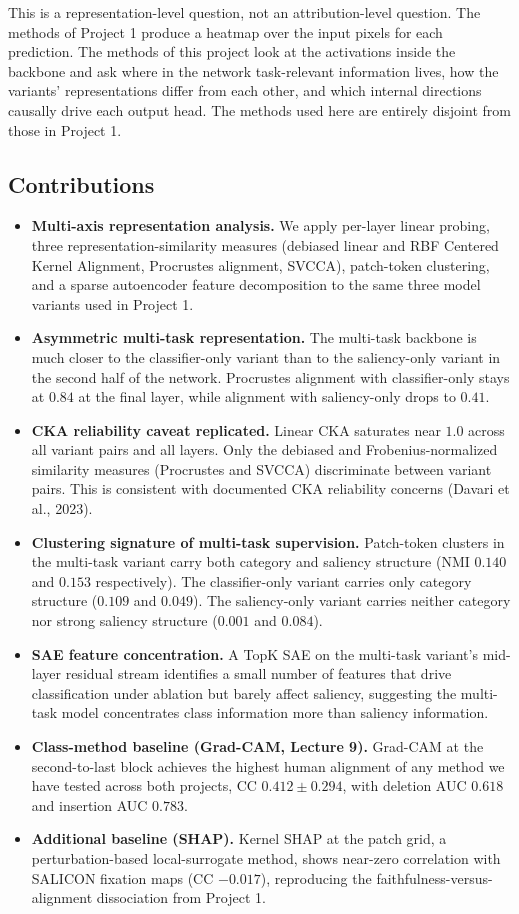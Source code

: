 \documentclass{article}
\begin{document}
This is a representation-level question, not an attribution-level question. The methods of Project 1 produce a heatmap over the input pixels for each prediction. The methods of this project look at the activations inside the backbone and ask where in the network task-relevant information lives, how the variants' representations differ from each other, and which internal directions causally drive each output head. The methods used here are entirely disjoint from those in Project 1.

\subsection{Contributions}
\begin{itemize}
    \item \textbf{Multi-axis representation analysis.} We apply per-layer linear probing, three representation-similarity measures (debiased linear and RBF Centered Kernel Alignment, Procrustes alignment, SVCCA), patch-token clustering, and a sparse autoencoder feature decomposition to the same three model variants used in Project 1.
    \item \textbf{Asymmetric multi-task representation.} The multi-task backbone is much closer to the classifier-only variant than to the saliency-only variant in the second half of the network. Procrustes alignment with classifier-only stays at $0.84$ at the final layer, while alignment with saliency-only drops to $0.41$.
    \item \textbf{CKA reliability caveat replicated.} Linear CKA saturates near $1.0$ across all variant pairs and all layers. Only the debiased and Frobenius-normalized similarity measures (Procrustes and SVCCA) discriminate between variant pairs. This is consistent with documented CKA reliability concerns (Davari et al., 2023).
    \item \textbf{Clustering signature of multi-task supervision.} Patch-token clusters in the multi-task variant carry both category and saliency structure (NMI $0.140$ and $0.153$ respectively). The classifier-only variant carries only category structure ($0.109$ and $0.049$). The saliency-only variant carries neither category nor strong saliency structure ($0.001$ and $0.084$).
    \item \textbf{SAE feature concentration.} A TopK SAE on the multi-task variant's mid-layer residual stream identifies a small number of features that drive classification under ablation but barely affect saliency, suggesting the multi-task model concentrates class information more than saliency information.
    \item \textbf{Class-method baseline (Grad-CAM, Lecture 9).} Grad-CAM at the second-to-last block achieves the highest human alignment of any method we have tested across both projects, CC $0.412 \pm 0.294$, with deletion AUC $0.618$ and insertion AUC $0.783$.
    \item \textbf{Additional baseline (SHAP).} Kernel SHAP at the patch grid, a perturbation-based local-surrogate method, shows near-zero correlation with SALICON fixation maps (CC $-0.017$), reproducing the faithfulness-versus-alignment dissociation from Project 1.
\end{itemize}
\end{document}
